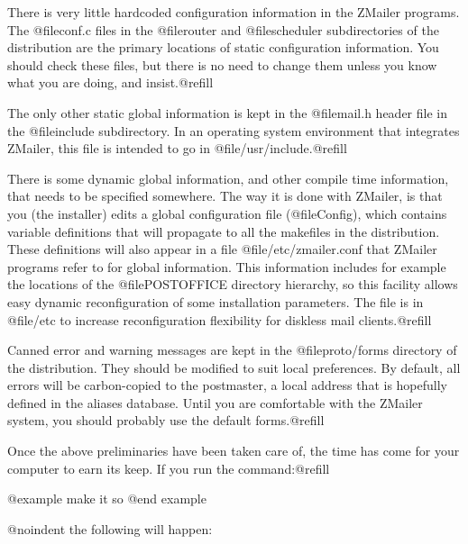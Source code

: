 {{There is very little hardcoded configuration information in the ZMailer
programs.  The @file{conf.c} files in the @file{router} and @file{scheduler}
subdirectories of the distribution are the primary locations of static
configuration information.  You should check these files, but there is no
need to change them unless you know what you are doing, and insist.@refill

The only other static global information is kept in the @file{mail.h} header
file in the @file{include} subdirectory.  In an operating system environment
that integrates ZMailer, this file is intended to go in
@file{/usr/include}.@refill

There is some dynamic global information, and other compile time information, 
that needs to be specified somewhere.  The way it is done with ZMailer, is
that you (the installer) edits a global configuration file (@file{Config}),
which contains variable definitions that will propagate to all the makefiles
in the distribution.  These definitions will also appear in a file
@file{/etc/zmailer.conf} that ZMailer programs refer to for global
information.  This information includes for example the locations of the
@file{POSTOFFICE} directory hierarchy, so this facility allows easy
dynamic reconfiguration of some installation parameters.  The file is in
@file{/etc} to increase reconfiguration flexibility for diskless mail
clients.@refill

Canned error and warning messages are kept in the @file{proto/forms}
directory of the distribution.  They should be modified to suit local
preferences.  By default, all errors will be carbon-copied to the postmaster,
a local address that is hopefully defined in the aliases database.  Until
you are comfortable with the ZMailer system, you should probably use the
default forms.@refill

Once the above preliminaries have been taken care of, the time has come for
your computer to earn its keep.  If you run the command:@refill

@example
make it so
@end example

@noindent
the following will happen:

}}
